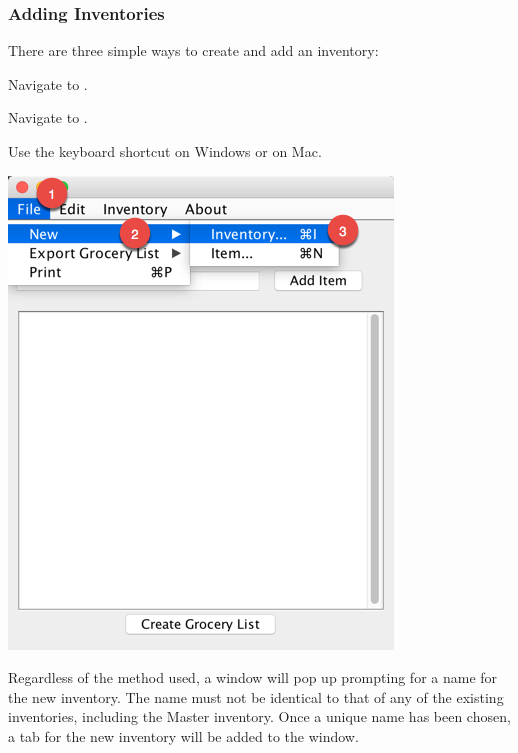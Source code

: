 \documentclass[letterpaper,12pt]{article}
\renewenvironment{enumerate}[1]{\begin{compactenum}#1}{\end{compactenum}}
\begin{document}
	\subsubsection{Adding Inventories}

There are three simple ways to create and add an inventory:

\begin{enumerate}
\item Navigate to .


\item Navigate to .


\item Use the keyboard shortcut  on Windows or  on Mac. \\

\end{enumerate}



\centerline{\includegraphics[scale=0.5]{06.png}}

Regardless of the method used, a window will pop up prompting for a name for the new inventory. The name must not be identical to that of any of the existing inventories, including the Master inventory. Once a unique name has been chosen, a tab for the new inventory will be added to the window.\\
\end{document}
